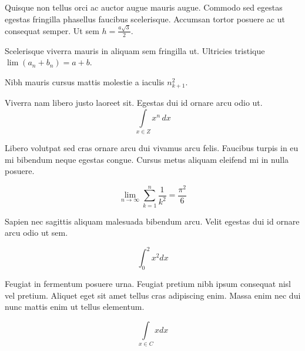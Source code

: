 \documentclass{article}
\begin{document}
Quisque non tellus orci ac auctor augue mauris augue. Commodo sed egestas egestas fringilla phasellus faucibus scelerisque. Accumsan tortor posuere ac ut consequat semper. Ut sem \begin{math}
	h=\frac{a\sqrt{3}}{2}
\end{math}.\newline

Scelerisque viverra mauris in aliquam sem fringilla ut. Ultricies tristique $ \lim\left ( a_n+b_n \right )=a+b $.\newline

Nibh mauris cursus mattis molestie a iaculis \( n_{k+1}^2 \).\newline

Viverra nam libero justo laoreet sit. Egestas dui id ornare arcu odio ut.
\[ \int\limits_{x\in Z}\! x^{n}\, dx \]

Libero volutpat sed cras ornare arcu dui vivamus arcu felis. Faucibus turpis in eu mi bibendum neque egestas congue. Cursus metus aliquam eleifend mi in nulla posuere.

$$ \lim_{n \to \infty}\sum_{k=1}^n \frac{1}{k^2}= \frac{\pi^2}{6} $$

Sapien nec sagittis aliquam malesuada bibendum arcu. Velit egestas dui id ornare arcu odio ut sem. 

\begin{displaymath}
	\int_0^2x^2dx
\end{displaymath}

Feugiat in fermentum posuere urna. Feugiat pretium nibh ipsum consequat nisl vel pretium. Aliquet eget sit amet tellus cras adipiscing enim. Massa enim nec dui nunc mattis enim ut tellus elementum.

\begin{equation}
	\int\limits_{x\in C}xdx
\end{equation}
\end{document}

